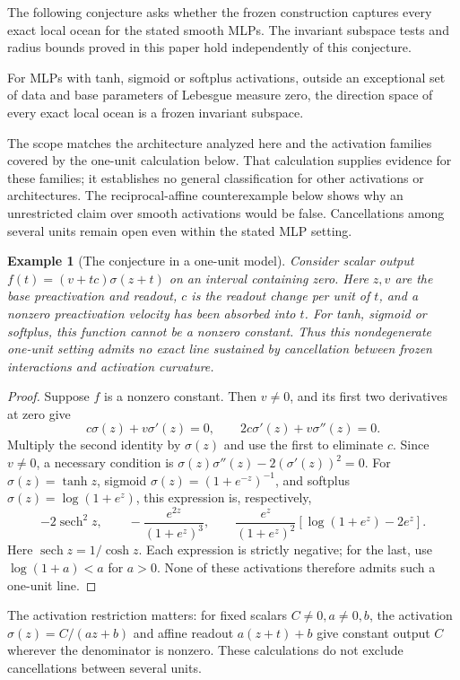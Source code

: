 \documentclass[twoside]{article}
\newtheorem{example}[theorem]{Example}
\theoremstyle{remark}
\theoremstyle{highlightdefinition}
\theoremstyle{remark}
\begin{document}
The following conjecture asks whether the frozen construction captures every exact local ocean for the stated smooth MLPs. The invariant subspace tests and radius bounds proved in this paper hold independently of this conjecture.
\begin{appconjecture}
For MLPs with tanh, sigmoid or softplus activations, outside an exceptional set of data and base parameters of Lebesgue measure zero, the direction space of every exact local ocean is a frozen invariant subspace.
\end{appconjecture}
The scope matches the architecture analyzed here and the activation families covered by the one-unit calculation below. That calculation supplies evidence for these families; it establishes no general classification for other activations or architectures. The reciprocal-affine counterexample below shows why an unrestricted claim over smooth activations would be false. Cancellations among several units remain open even within the stated MLP setting.

\begin{example}[The conjecture in a one-unit model]
Consider scalar output $f(t)=(v+tc)\sigma(z+t)$ on an interval containing zero. Here $z,v$ are the base preactivation and readout, $c$ is the readout change per unit of $t$, and a nonzero preactivation velocity has been absorbed into $t$. For tanh, sigmoid or softplus, this function cannot be a nonzero constant. Thus this nondegenerate one-unit setting admits no exact line sustained by cancellation between frozen interactions and activation curvature.
\end{example}
\begin{proof}
Suppose $f$ is a nonzero constant. Then $v\ne0$, and its first two derivatives at zero give
\[
 c\sigma(z)+v\sigma'(z)=0,\qquad
 2c\sigma'(z)+v\sigma''(z)=0.
\]
Multiply the second identity by $\sigma(z)$ and use the first to eliminate $c$. Since $v\ne0$, a necessary condition is $\sigma(z)\sigma''(z)-2(\sigma'(z))^2=0$. For $\sigma(z)=\tanh z$, sigmoid $\sigma(z)=(1+e^{-z})^{-1}$, and softplus $\sigma(z)=\log(1+e^z)$, this expression is, respectively,
\[
 -2\operatorname{sech}^2z,\qquad
 -\frac{e^{2z}}{(1+e^z)^3},\qquad
 \frac{e^z}{(1+e^z)^2}[\log(1+e^z)-2e^z].
\]
Here $\operatorname{sech}z=1/\cosh z$. Each expression is strictly negative; for the last, use $\log(1+a)<a$ for $a>0$. None of these activations therefore admits such a one-unit line.
\end{proof}
The activation restriction matters: for fixed scalars $C\ne0,a\ne0,b$, the activation $\sigma(z)=C/(az+b)$ and affine readout $a(z+t)+b$ give constant output $C$ wherever the denominator is nonzero. These calculations do not exclude cancellations between several units.
\end{document}
